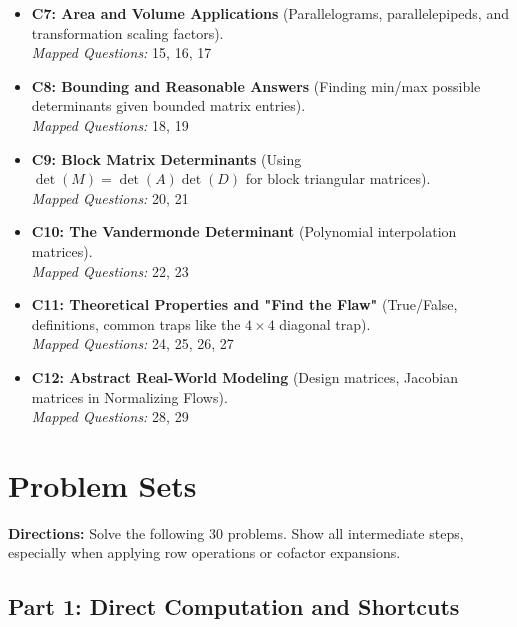 \documentclass[11pt]{article}
\begin{document}
\begin{itemize}
    \item \textbf{C7: Area and Volume Applications} (Parallelograms, parallelepipeds, and transformation scaling factors). \\
    \textit{Mapped Questions:} 15, 16, 17
    
    \item \textbf{C8: Bounding and Reasonable Answers} (Finding min/max possible determinants given bounded matrix entries). \\
    \textit{Mapped Questions:} 18, 19
    
    \item \textbf{C9: Block Matrix Determinants} (Using $\det(M) = \det(A)\det(D)$ for block triangular matrices). \\
    \textit{Mapped Questions:} 20, 21
    
    \item \textbf{C10: The Vandermonde Determinant} (Polynomial interpolation matrices). \\
    \textit{Mapped Questions:} 22, 23
    
    \item \textbf{C11: Theoretical Properties and "Find the Flaw"} (True/False, definitions, common traps like the $4 \times 4$ diagonal trap). \\
    \textit{Mapped Questions:} 24, 25, 26, 27
    
    \item \textbf{C12: Abstract Real-World Modeling} (Design matrices, Jacobian matrices in Normalizing Flows). \\
    \textit{Mapped Questions:} 28, 29
\end{itemize}

\newpage

\section{Problem Sets}

\textbf{Directions:} Solve the following 30 problems. Show all intermediate steps, especially when applying row operations or cofactor expansions.

\subsection*{Part 1: Direct Computation and Shortcuts}
\end{document}
